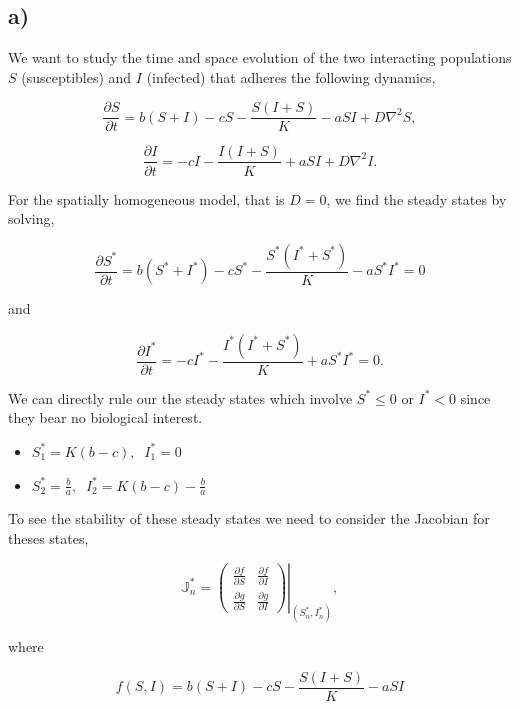 \subsection*{a)}

We want to study the time and space evolution of the two interacting populations $S$ (susceptibles) and $I$ (infected) that adheres the following dynamics,

\begin{equation}
\label{eq:partSt}
\frac{\partial S}{\partial t} = b(S+I)-cS -\frac{S(I+S)}{K}-aSI + D\nabla^2S,
\end{equation}

\begin{equation}
\label{eq:partIt}
\frac{\partial I}{\partial t}= -cI -\frac{I(I+S)}{K}+aSI +D\nabla^2I.
\end{equation}

For the spatially homogeneous model, that is $D=0$, we find the steady states by solving,

$$
\frac{\partial S^*}{\partial t}=b(S^*+I^*)-cS^*-\frac{S^*(I^*+S^*)}{K}-aS^*I^* =0
$$

and

$$
\frac{\partial I^*}{\partial t}=-cI^*-\frac{I^*(I^*+S^*)}{K}+aS^*I^*=0.
$$

We can directly rule our the steady states which involve $S^*\leq0$ or $I^*<0$ since they bear no biological interest.

\begin{itemize}
\item $S^*_1=K(b-c), \;\; I^*_1=0$
\item $S^*_2=\frac{b}{a}, \;\; I^*_2=K(b-c)-\frac{b}{a}$ 
\end{itemize}

To see the stability of these steady states we need to consider the Jacobian for theses states,

\begin{equation}
\mathbb{J}^*_n=\left.\left(
\begin{array}{cc}
\frac{\partial f}{\partial S} & \frac{\partial f}{\partial I} \\
\frac{\partial g}{\partial S} & \frac{\partial g}{\partial I}
\end{array}\right)\right|_{(S^*_n,I^*_n)},
\end{equation}

where 

\begin{equation}
f(S,I)=b(S+I)-cS-\frac{S(I+S)}{K}-aSI
\end{equation}

